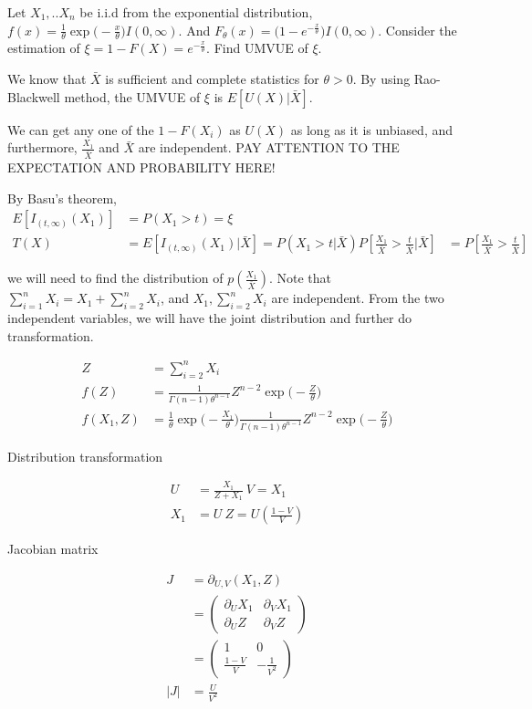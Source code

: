 \begin{Example}
Let $X_1, ..X_n$ be i.i.d from the exponential distribution, $f(x) = \frac{1}{\theta} \exp \Big(-\frac{x}{\theta} \Big) I(0, \infty)$. And $F_{\theta}(x) = \Big( 1 - e^{-\frac{x}{\theta}}\Big) I(0, \infty)$. 
Consider the estimation of $\xi = 1 - F(X) = e^{-\frac{x}{\theta}}$. Find UMVUE of $\xi$.

We know that $\bar{X}$ is sufficient and complete statistics for $\theta > 0$. By using Rao-Blackwell method, the UMVUE of $\xi$ is $E[U(X)| \bar{X}]$. 

We can get any one of the $1 - F(X_i)$ as $U(X)$ as long as it is unbiased, and furthermore, $\frac{X_1}{\bar{X}}$ and $\bar{X}$ are independent. PAY ATTENTION TO THE EXPECTATION AND PROBABILITY HERE!

By Basu's theorem,
\begin{align*}
E[ I_{(t, \infty)} (X_1)] & = P(X_1 > t) = \xi \\
T(X) &= E[ I_{(t, \infty)} (X_1) | \bar{X}] = P(X_1 > t | \bar{X}) 
P[\frac{X_1}{\bar{X}} >  \frac{t}{\bar{X}} | \bar{X}] & = P[\frac{X_1}{\bar{X}} >  \frac{t}{\bar{X}} ]
\end{align*}

we will need to find the distribution of $p(\frac{X_1}{\bar{X}})$. Note that $\sum_{i=1}^n X_i = X_1 + \sum_{i=2}^n X_i$, and $X_1, \sum_{i=2}^n X_i$ are independent. 
From the two independent variables, we will have the joint distribution and further do transformation.

\begin{align*}
Z &= \sum_{i=2}^n X_i \\
f(Z) &= \frac{1}{\Gamma(n-1) \theta^{n-1}} Z^{n-2} \exp \Big(- \frac{Z}{\theta} \Big) \\
f(X_1, Z) &=\frac{1}{\theta} \exp \Big(-\frac{X_1}{\theta} \Big) \frac{1}{\Gamma(n-1) \theta^{n-1}} Z^{n-2} \exp \Big(- \frac{Z}{\theta} \Big) 
\end{align*}

Distribution transformation

\begin{align*}
U &= \frac{X_1}{Z + X_1} \
V = X_1 \\
X_1 &= U\
Z = U (\frac{1-V}{V})
\end{align*}

Jacobian matrix 

\begin{align*}
J &= \partial_{U, V} (X_1, Z)\\
&=  \begin{pmatrix} 
\partial_{U} X_1 & \partial_{V} X_1 \\
\partial_{U} Z & \partial_{V} Z 
\end{pmatrix}\\
&=  \begin{pmatrix} 
1 & 0 \\
\frac{1-V}{V} & -\frac{1}{V^2}
\end{pmatrix}\\
\vert J \vert &= \frac{U}{V^2}
\end{align*}


\end{Example}
